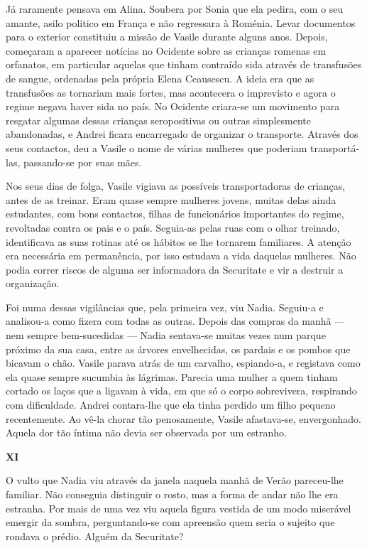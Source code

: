 Já raramente pensava em Alina. Soubera por Sonia que ela pedira, com o
seu amante, asilo político em França e não regressara à Roménia. Levar
documentos para o exterior constituiu a missão de Vasile durante alguns
anos. Depois, começaram a aparecer notícias no Ocidente sobre as
crianças romenas em orfanatos, em particular aquelas
que tinham contraído sida através de transfusões de sangue, ordenadas
pela própria Elena Ceausescu. A ideia era que as transfusões as
tornariam mais fortes, mas acontecera o imprevisto e agora o regime
negava haver sida no país. No Ocidente criara-se um movimento para
resgatar algumas dessas crianças seropositivas ou outras simplesmente
abandonadas, e Andrei ficara encarregado de organizar o transporte.
Através dos seus contactos, deu a Vasile o nome de várias mulheres que
poderiam transportá-las, passando-se por suas mães.

Nos seus dias de folga, Vasile vigiava as possíveis transportadoras de
crianças, antes de as treinar. Eram quase sempre mulheres jovens, muitas
delas ainda estudantes, com bons contactos, filhas de funcionários importantes do regime, revoltadas contra os pais e o país. Seguia-as pelas
ruas com o olhar treinado, identificava as suas rotinas até os hábitos
se lhe tornarem familiares. A atenção era necessária em permanência, por
isso estudava a vida daquelas mulheres. Não podia correr riscos de
alguma ser informadora da Securitate e vir a destruir a organização.

Foi numa dessas vigilâncias que, pela primeira vez, viu Nadia. Seguiu-a
e analisou-a como fizera com todas as outras. Depois das compras da
manhã --- nem sempre bem-sucedidas --- Nadia sentava-se muitas vezes num parque próximo da sua
casa, entre as árvores envelhecidas, os pardais e os pombos que bicavam
o chão. Vasile parava atrás de um carvalho, espiando-a, e registava como
ela quase sempre sucumbia às lágrimas. Parecia uma mulher a quem tinham
cortado os laços que a ligavam à vida,
em que só o corpo sobrevivera, respirando com dificuldade. Andrei
contara-lhe que ela tinha perdido um filho pequeno recentemente. Ao
vê-la chorar tão penosamente, Vasile afastava-se, envergonhado. Aquela
dor tão íntima não devia ser observada por um estranho.


\pagebreak
\vspace*{1.8cm}
\noindent{}\textbf{XI}

\bigskip

O vulto que Nadia viu através da janela naquela manhã de Verão
pareceu-lhe familiar. Não conseguia distinguir o rosto, mas a forma de
andar não lhe era estranha. Por mais de uma vez viu aquela figura
vestida de um modo miserável emergir da sombra, perguntando-se com
apreensão quem seria o sujeito que rondava o prédio. Alguém da
Securitate?

